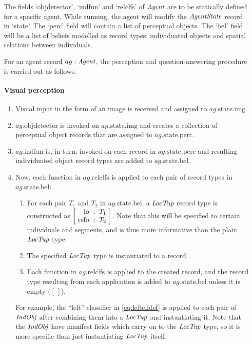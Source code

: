 The fields `objdetector', `indfun' and `relclfs' of $\mathit{Agent}$ are to be statically defined for a specific agent.
While running, the agent will modify the $\mathit{AgentState}$ record in `state'.
The `perc' field will contain a list of perceptual objects.
The `bel' field will be a list of beliefs modelled as record types:
individuated objects and spatial relations between individuals.

For an agent record $ag : \mathit{Agent}$, the perception and question-answering procedure is carried out as follows.

\paragraph{Visual perception}
\renewcommand{\itemautorefname}{Step}

\begin{enumerate}
\item Visual input in the form of an image is received and assigned to $ag.\text{state}.\text{img}$.
\item $ag.\text{objdetector}$ is invoked on $ag.\text{state.img}$ and creates a collection of perceptual object records that are assigned to $ag.\text{state}.\text{perc}$.
\item $ag.\text{indfun}$ is, in turn, invoked on each record in $ag.\text{state.perc}$ and resulting individuated object record types are added to $ag.\text{state.bel}$.
\item \label{item:relclfsbel} Now, each function in $ag.\text{relclfs}$ is applied to each pair of record types in $ag.\text{state.bel}$:
	\begin{enumerate}
		\item For each pair $T_1$ and $T_2$ in $ag.\text{state.bel}$, a $\mathit{LocTup}$ record type is constructed as $\rec{\text{lo} &:& T_1 \\ \text{refo} &:& T_2}$.
			Note that this will be specified to certain individuals and segments, and is thus more informative than the plain $\mathit{LocTup}$ type.
		\item The specified $\mathit{LocTup}$ type is instantiated to a record.
	\item Each function in $ag.\text{relclfs}$ is applied to the created record, and the record type resulting from each application is added to $ag.\text{state.bel}$ unless it is empty ($[\:]$).
	\end{enumerate}
		For example, the ``left'' classifier in \autoref{eq:leftclfdef} is applied to each pair of $\mathit{IndObj}$ after combining them into a $\mathit{LocTup}$ and instantiating it.
		Note that the $\mathit{IndObj}$ have manifest fields which carry on to the $\mathit{LocTup}$ type, so it is more specific than just instantiating $\mathit{LocTup}$ itself.
\end{enumerate}

